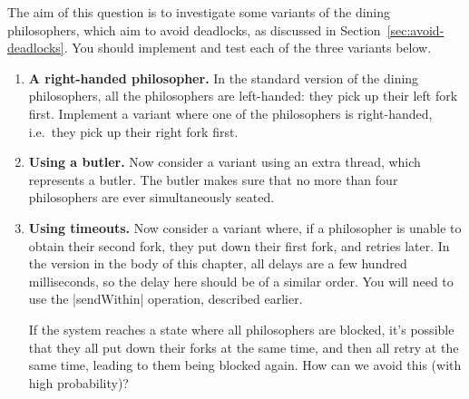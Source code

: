 \begin{question}
\label{ex:diningPhils}
The aim of this question is to investigate some variants of the dining
philosophers, which aim to avoid deadlocks, as discussed in
Section~\ref{sec:avoid-deadlocks}.  You should implement and test each of the
three variants below.
%
\begin{enumerate}
\item \textbf{A right-handed philosopher.}
In the standard version of the dining philosophers, all the philosophers are
left-handed: they pick up their left fork first.  Implement a variant where
one of the philosophers is right-handed, i.e.\ they pick up their right fork
first.

\item \textbf{Using a butler.} Now consider a variant using an extra
  thread, which represents a butler.  The butler makes sure that no more than
  four philosophers are ever simultaneously seated.

\item \textbf{Using timeouts.} Now consider a variant where, if a
  philosopher is unable to obtain their second fork, they put down their first
  fork, and retries later.  In the version in the body of this chapter, all
  delays are a few hundred milliseconds, so the delay here should be of a
  similar order.  You will need to use the |sendWithin| operation, described
  earlier. 

If the system reaches a state where all philosophers are blocked, it's
possible that they all put down their forks at the same time, and then all
retry at the same time, leading to them being blocked again.  How can we avoid
this (with high probability)?
\end{enumerate}
\end{question}


